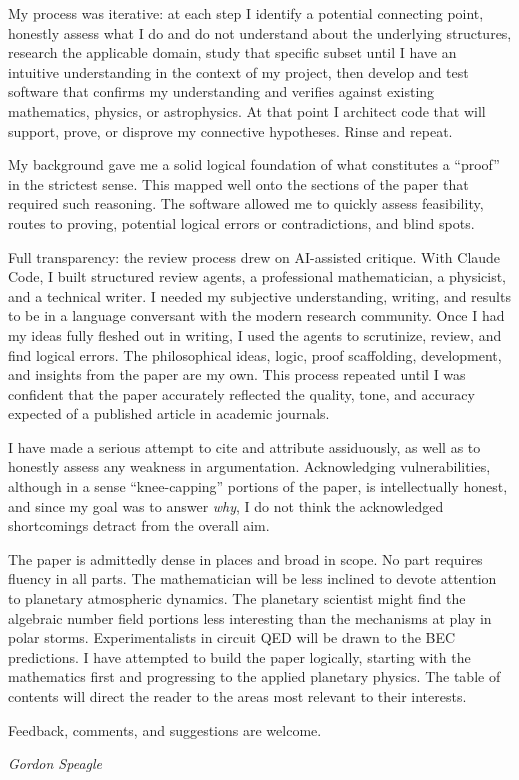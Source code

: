 My process was iterative: at each step I identify a potential connecting
point, honestly assess what I do and do not understand about the
underlying structures, research the applicable domain, study that
specific subset until I have an intuitive understanding in the context
of my project, then develop and test software that confirms my
understanding and verifies against existing mathematics, physics, or
astrophysics.  At that point I architect code that will support, prove,
or disprove my connective hypotheses.  Rinse and repeat.

My background gave me a solid logical foundation of what constitutes
a ``proof'' in the strictest sense.  This mapped well onto the sections
of the paper that required such reasoning.  The software allowed me to
quickly assess feasibility, routes to proving, potential logical errors
or contradictions, and blind spots.

Full transparency: the review process drew on AI-assisted critique.
With Claude Code, I built structured review agents, a professional
mathematician, a physicist, and a technical writer.  I needed my
subjective understanding, writing, and results to be in a language
conversant with the modern research community.  Once I had my ideas
fully fleshed out in writing, I used the agents to scrutinize, review,
and find logical errors.  The philosophical ideas, logic, proof
scaffolding, development, and insights from the paper are my own.
This process repeated until I was confident that the paper accurately
reflected the quality, tone, and accuracy expected of a published
article in academic journals.

I have made a serious attempt to cite and attribute assiduously, as
well as to honestly assess any weakness in argumentation.
Acknowledging vulnerabilities, although in a sense ``knee-capping''
portions of the paper, is intellectually honest, and since my goal was
to answer \emph{why}, I do not think the acknowledged shortcomings
detract from the overall aim.

The paper is admittedly dense in places and broad in scope.  No part
requires fluency in all parts.  The mathematician will be less inclined
to devote attention to planetary atmospheric dynamics.  The planetary
scientist might find the algebraic number field portions less
interesting than the mechanisms at play in polar storms.
Experimentalists in circuit QED will be drawn to the BEC predictions.
I have attempted to build the paper logically, starting with the
mathematics first and progressing to the applied planetary physics.
The table of contents will direct the reader to the areas most
relevant to their interests.

Feedback, comments, and suggestions are welcome.

\begin{flushright}
\emph{Gordon Speagle}
\end{flushright}




